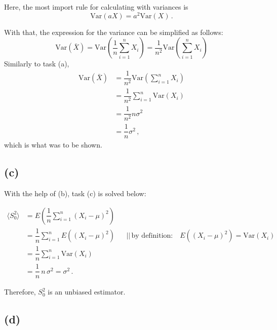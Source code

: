 Here, the most import rule for calculating with variances is
\begin{equation*}
    \text{Var}(aX) = a^2 \text{Var}(X) \,.
\end{equation*}

With that, the expression for the variance can be simplified as follows:
\begin{equation*}
    \text{Var}(\bar{X}) = \text{Var} \left(\dfrac{1}{n} \sum_{i=1}^n X_i \right) = \dfrac{1}{n^2} \text{Var} \left(\sum_{i=1}^n X_i \right)
\end{equation*}
Similarly to task (a),
\begin{align*}
    \text{Var}(\bar{X}) &= \dfrac{1}{n^2} \text{Var} \left(\sum_{i=1}^n X_i \right) \\
                        &= \dfrac{1}{n^2} \sum_{i=1}^n \text{Var}(X_i) \\
                        &= \dfrac{1}{n^2} n \sigma^2 \\
                        &= \dfrac{1}{n} \sigma^2 \,,
\end{align*}
which is what was to be shown.

\subsection*{(c)}

With the help of (b), task (c) is solved below:

\begin{align*}
    \langle S_0^2 \rangle &= E \left( \dfrac{1}{n} \sum_{i=1}^n (X_i - \mu)^2 \right) \\
                          &= \dfrac{1}{n} \sum_{i=1}^n E((X_i - \mu)^2) && \text{||} \, \text{by definition:} \quad E((X_i - \mu)^2) = \text{Var}(X_i) \\
                          &= \dfrac{1}{n} \sum_{i=1}^n \text{Var}(X_i) \\
                          &= \dfrac{1}{n} \, n \, \sigma^2 = \sigma^2 \,.
\end{align*}

Therefore, $S_0^2$ is an unbiased estimator.

\subsection*{(d)}

